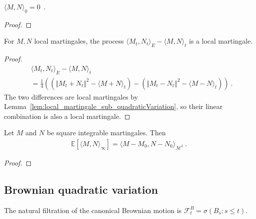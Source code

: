 \begin{lemma}\label{lem:covariation_zero}
$\langle M, N \rangle_0 = 0$~.
\end{lemma}

\begin{proof}

\end{proof}


\begin{lemma}\label{lem:local_martingale_sub_covariation}
For $M, N$ local martingales, the process $\langle M_t, N_t \rangle_E - \langle M, N \rangle_t$ is a local martingale.
\end{lemma}

\begin{proof}
\begin{align*}
  &\langle M_t, N_t \rangle_E - \langle M, N \rangle_t
  \\
  &= \frac{1}{4}\left( \left(\Vert M_t + N_t \Vert^2 - \langle M+N \rangle_t\right) - \left(\Vert M_t - N_t \Vert^2 - \langle M-N \rangle_t\right) \right)
  \: .
\end{align*}
The two differences are local martingales by Lemma~\ref{lem:local_martingale_sub_quadraticVariation}, so their linear combination is also a local martingale.
\end{proof}


\begin{lemma}\label{lem:covariation_eq_inner}
Let $M$ and $N$ be square integrable martingales. Then
\begin{align*}
  \mathbb{E}\left[\langle M,N \rangle_\infty\right] = \langle M - M_0, N - N_0 \rangle_{\mathcal{M}^2}
  \: .
\end{align*}
\end{lemma}

\begin{proof}

\end{proof}


\subsection{Brownian quadratic variation}

\begin{definition}\label{def:brownianNaturalFiltration}
  \leanok
The natural filtration of the canonical Brownian motion is
\(\mathcal F^B_t = \sigma(B_s : s \le t)\).
\end{definition}

